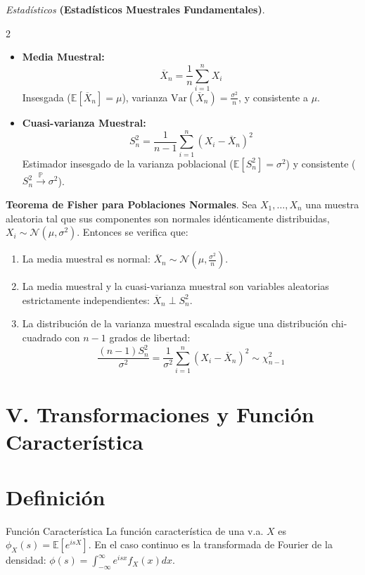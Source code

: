 \vspace{0.5em}

\noindent \textit{Estadísticos} \textbf{(Estadísticos Muestrales Fundamentales)}.

\begin{multicols}{2}
\begin{itemize}
    \item \textbf{Media Muestral:} 
    $$ \overline{X}_n = \frac{1}{n} \sum_{i=1}^n X_i $$
    Insesgada ($\mathbb{E}[\overline{X}_n] = \mu$), varianza $\text{Var}(\overline{X}_n) = \frac{\sigma^2}{n}$, y consistente a $\mu$.
    
    \item \textbf{Cuasi-varianza Muestral:} 
    $$ S_n^2 = \frac{1}{n-1} \sum_{i=1}^n (X_i - \overline{X}_n)^2 $$
    Estimador insesgado de la varianza poblacional ($\mathbb{E}[S_n^2] = \sigma^2$) y consistente ($S_n^2 \xrightarrow{\mathbb{P}} \sigma^2$).
\end{itemize}
\end{multicols}

\vspace{0.5em}

\noindent \textbf{Teorema de Fisher para Poblaciones Normales}. Sea $X_1, \dots, X_n$ una muestra aleatoria tal que sus componentes son normales idénticamente distribuidas, $X_i \sim \mathcal{N}(\mu, \sigma^2)$. Entonces se verifica que:
\begin{enumerate}
    \item La media muestral es normal: $\overline{X}_n \sim \mathcal{N}\left(\mu, \frac{\sigma^2}{n}\right)$.
    \item La media muestral y la cuasi-varianza muestral son variables aleatorias estrictamente independientes: $\overline{X}_n \perp S_n^2$.
    \item La distribución de la varianza muestral escalada sigue una distribución chi-cuadrado con $n-1$ grados de libertad: 
    $$ \frac{(n-1)S_n^2}{\sigma^2} = \frac{1}{\sigma^2} \sum_{i=1}^n (X_i - \overline{X}_n)^2 \sim \chi^2_{n-1} $$
\end{enumerate}

\section*{V. Transformaciones y Función Característica}

\section*{Definición}{Función Característica} La función característica de una v.a. $X$ es $\phi_X(s) = \mathbb{E}[e^{isX}]$. En el caso continuo es la transformada de Fourier de la densidad: $\phi(s) = \int_{-\infty}^{\infty} e^{isx} f_X(x) dx$.

